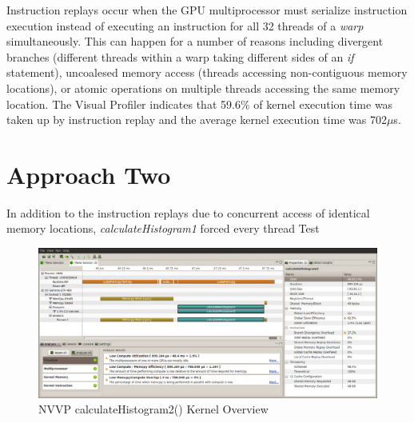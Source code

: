 \documentclass{article}
\begin{document}
Instruction replays occur when the GPU multiprocessor must serialize instruction execution instead of executing an instruction for all 32 threads of a \emph{warp} simultaneously. This can happen for a number of reasons including divergent branches (different threads within a warp taking different sides of an \emph{if} statement), uncoalesed memory access (threads accessing non-contiguous memory locations), or atomic operations on multiple threads accessing the same memory location. The Visual Profiler indicates that 59.6\% of kernel execution time was taken up by instruction replay and the average kernel execution time was 702$\mu$s.

\section{Approach Two}\label{approach2}

In addition to the instruction replays due to concurrent access of identical memory locations, \emph{calculateHistogram1} forced every thread Test\cite{shared-memory}

\begin{figure}
\centering
\includegraphics[width=1.0\textwidth]{screenshots/nvvp/calculateHistogram2_screen1.png}
\caption{NVVP calculateHistogram2() Kernel Overview }
\label{kernel2nvvp1}
\end{figure}
\end{document}
